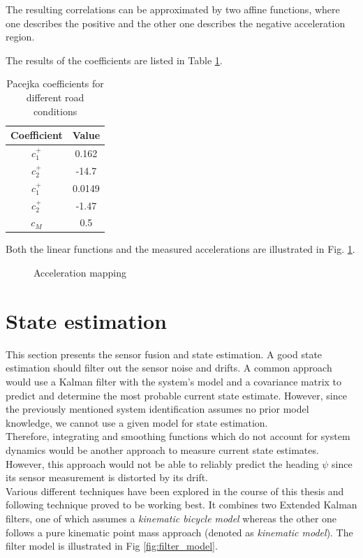The resulting correlations can be approximated by two affine functions, where one describes the positive and the other one describes the negative acceleration region.

The results of the coefficients are listed in Table \ref{tab:v_mapping}.
\begin{table}[h!]
\centering
\caption{Pacejka coefficients for different road conditions}
\begin{tabular}{c|c}
Coefficient & Value\\
\hline
$c_1^+$ & 0.162\\
$c_2^+$ & -14.7\\
$c_1^+$ & 0.0149\\
$c_2^+$ & -1.47\\
$c_M$ & 0.5
\end{tabular}
\label{tab:v_mapping}
\end{table}

Both the linear functions and the measured accelerations are illustrated in Fig. \ref{fig:v_over_u}.

\begin{figure}[ht]
    \centering
      
    \caption{Acceleration mapping}
    \label{fig:v_over_u}
\end{figure}

\section{State estimation}\label{sec:stateEstimation}
This section presents the sensor fusion and state estimation. A good state estimation should filter out the sensor noise and drifts. A common approach would use a Kalman filter with the system's model and a covariance matrix to predict and determine the most probable current state estimate. However, since the previously mentioned system identification assumes no prior model knowledge, we cannot use a given model for state estimation.\\
Therefore, integrating and smoothing functions which do not account for system dynamics would be another approach to measure current state estimates. However, this approach would not be able to reliably predict the heading $\psi$ since its sensor measurement is distorted by its drift.\\
Various different techniques have been explored in the course of this thesis and following technique proved to be working best. It combines two Extended Kalman filters, one of which assumes a \emph{kinematic bicycle model} whereas the other one follows a pure kinematic point mass approach (denoted as \emph{kinematic model}). The filter model is illustrated in Fig \ref{fig:filter_model}.

